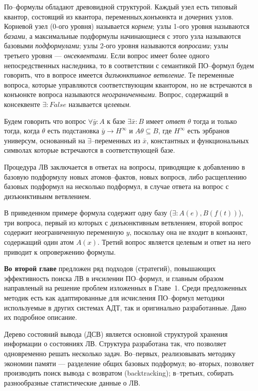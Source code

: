 \documentclass[a4paper]{report}
\begin{document}
По--формулы обладают древовидной структурой. Каждый узел есть типовый квантор, состоящий из квантора, переменных,конъюнкта и дочерних узлов. Корневой узел (0-ого уровня) называется \emph{корнем}; узлы 1-ого уровня называются \emph{базами}, а максимальные подформулы начинающиеся с этого узла называются базовыми \emph{подформулами}; узлы 2-ого уровня называются \emph{вопросами}; узлы третьего уровня --- \emph{онсеквентами}. Если вопрос имеет более одного непосредственных наследника, то в соответствии с семантикой ПО--формул будем говорить, что в вопросе имеется \emph{дизъюнктивное ветвление}. Те переменные вопроса, которые управляются соответствующим квантором, но не встречаются в конъюнкте вопроса называются \emph{неограниченными}. Вопрос, содержащий в консеквенте $\exists: False$ называется \emph{целевым}. 

Будем говорить что вопрос $\forall \bar{y}\colon A$ к базе $\exists \bar{x}\colon B$ имеет {\em ответ} $\theta$  тогда и только тогда, когда $\theta$ есть подстановка $\bar{y} \rightarrow H^{\infty}$ и $A\theta \subseteq B$, где $H^{\infty}$ есть эрбранов универсум, основанный на $\exists$--переменных из $\bar{x}$, константных и функциональных символах которые встречаются в соответствующей базе.

Процедура ЛВ заключается в ответах на вопросы, приводящие к добавлению в базовую подформулу новых атомов--фактов, новых вопросв, либо расщеплению базовых подформул на несколько подформул, в случае ответа на вопрос с дизъюнктивынм ветвлением.

В приведенном примере формула содержит одну базу ($\exists: A(e),B(f(t))$), три вопроса, первый из которых с дизъюнктивным ветвлением, второй вопрос содержит неограниченную переменную $y$, поскольку она не входит в конъюнкт, содержащий один атом $A(x)$. Третий вопрос является целевым и ответ на него приводит к опровержению формулы.



\textbf{Во второй главе} предложен ряд подходов (стратегий), повышающих эффективность поиска ЛВ в ичсилении ПО--формул, и главным образом направленый на решение проблем изложенных в Главе~1. Среди предложенных методик есть как адаптированные для исчисления ПО--формул методики используемые в других системах АДТ, так и оригинально разработанные. Дано их подробное описание.

Дерево состояний вывода (ДСВ) является основной структурой хранения информации о состояниях ЛВ. Структура разработана так, что позволяет одновременно решать несколько задач. Во--первых, реализовывать методику экономии памяти --- разделение общих базовых подформул; во--вторых, позволяет производить поиск вывода с возвратом (backtracking); в--третьих, собирать разнообразные статистические данные о ЛВ.
\end{document}
